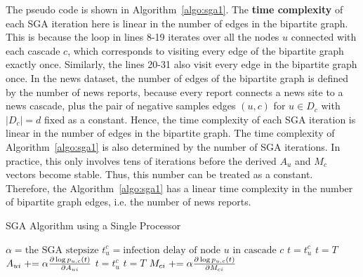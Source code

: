 The pseudo code is shown in Algorithm~\ref{algo:sga1}.
The \textbf{time complexity} of each SGA iteration here is linear in the number of edges in the bipartite graph. This is because the loop in lines 8-19 iterates over all the nodes $u$ connected with each cascade $c$, which corresponds to visiting every edge of the bipartite graph exactly once. Similarly, the lines 20-31 also visit every edge in the bipartite graph once. In the news dataset, the number of edges of the bipartite graph is defined by the number of news reports, because every report connects a news site to a news cascade, plus the pair of negative samples edges $(u, c)$ for $u\in D_c$ with $|D_c|=d$ fixed as a constant. Hence, the time complexity of each SGA iteration is linear in the number of edges in the bipartite graph. The time complexity of Algorithm~\ref{algo:sga1} is also determined by the number of SGA iterations. In practice, this only involves tens of iterations before the derived $A_u$ and $M_c$ vectors become stable. Thus, this number can be treated as a constant. Therefore, the Algorithm~\ref{algo:sga1} has a linear time complexity in the number of bipartite graph edges, i.e. the number of news reports.


\begin{algorithm}
\caption{SGA Algorithm using a Single Processor}\label{algo:sga1}
\begin{algorithmic}[1]
\State $\alpha = \text{the SGA stepsize}$
\State $t_u^c = \text{infection delay of node $u$ in cascade $c$}$
\EndFor
\EndFor
{}
\State $t= t_u^c$
\State $t= T$
\EndIf
{}
\State $A_{ui} \mathrel{+}= \alpha \frac{\partial \log p_{u,c}(t) }{\partial A_{ui}}$
\EndFor
\EndFor
\EndFor
{}
\State $t= t_u^c$
\State $t= T$
\EndIf
{}
\State $M_{ci} \mathrel{+}= \alpha \frac{\partial \log p_{u,c}(t) }{\partial M_{ci}}$
\EndFor
\EndFor
\EndFor
\EndFor
\end{algorithmic}
\end{algorithm}

